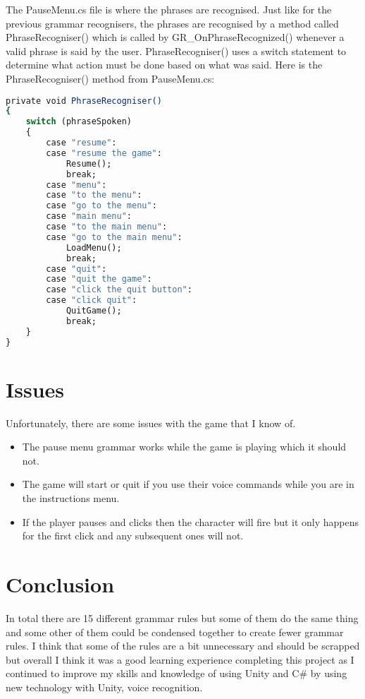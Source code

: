 \documentclass{article}
\begin{document}
The PauseMenu.cs file is where the phrases are recognised. Just like for the previous grammar recognisers, the phrases are recognised by a method called PhraseRecogniser() which is called by GR\_OnPhraseRecognized() whenever a valid phrase is said by the user. PhraseRecogniser() uses a switch statement to determine what action must be done based on what was said. Here is the PhraseRecogniser() method from PauseMenu.cs:
\begin{lstlisting}[language=csh]
private void PhraseRecogniser()
{
    switch (phraseSpoken)
    {
        case "resume":
        case "resume the game":
            Resume();
            break;
        case "menu":
        case "to the menu":
        case "go to the menu":
        case "main menu":
        case "to the main menu":
        case "go to the main menu":
            LoadMenu();
            break;
        case "quit":
        case "quit the game":
        case "click the quit button":
        case "click quit":
            QuitGame();
            break;
    }
}
\end{lstlisting}

\section{Issues}
\label{sec:issues}
Unfortunately, there are some issues with the game that I know of.
\begin{itemize}
	\item The pause menu grammar works while the game is playing which it should not.
	\item The game will start or quit if you use their voice commands while you are in the instructions menu.
	\item If the player pauses and clicks then the character will fire but it only happens for the first click and any subsequent ones will not.
\end{itemize}

\section{Conclusion}
In total there are 15 different grammar rules but some of them do the same thing and some other of them could be condensed together to create fewer grammar rules. I think that some of the rules are a bit unnecessary and should be scrapped but overall I think it was a good learning experience completing this project as I continued to improve my skills and knowledge of using Unity and C\# by using new technology with Unity, voice recognition.
\end{document}
